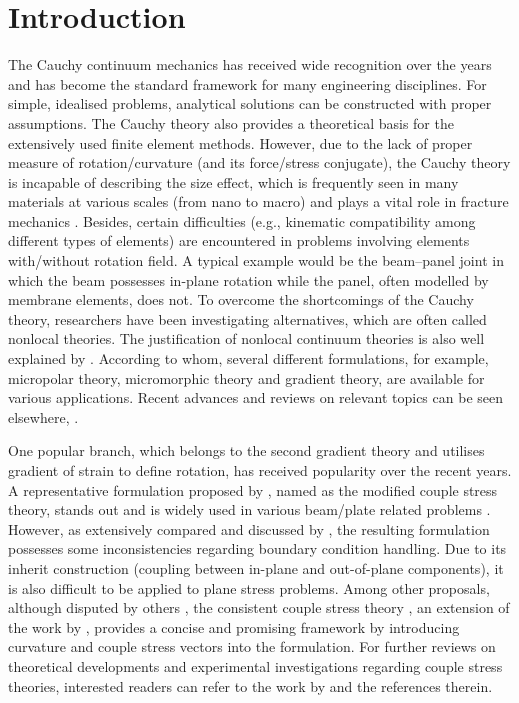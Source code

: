 \documentclass[3p,sort&compress,11pt,fleqn,review]{elsarticle}
\begin{document}
\section{Introduction}
The Cauchy continuum mechanics has received wide recognition over the years and has become the standard framework for many engineering disciplines. For simple, idealised problems, analytical solutions can be constructed \citep[see, e.g.,][]{Timoshenko2010} with proper assumptions. The Cauchy theory also provides a theoretical basis for the extensively used finite element methods. However, due to the lack of proper measure of rotation/curvature (and its force/stress conjugate), the Cauchy theory is incapable of describing the size effect, which is frequently seen in many materials at various scales (from nano to macro) and plays a vital role in fracture mechanics \citep{Bazant1984}. Besides, certain difficulties (e.g., kinematic compatibility among different types of elements) are encountered in problems involving elements with/without rotation field. A typical example would be the beam--panel joint in which the beam possesses in-plane rotation while the panel, often modelled by membrane elements, does not. To overcome the shortcomings of the Cauchy theory, researchers have been investigating alternatives, which are often called nonlocal theories. The justification of nonlocal continuum theories is also well explained by \citet{Eringen2004}. According to whom, several different formulations, for example, micropolar theory, micromorphic theory and gradient theory, are available for various applications. Recent advances and reviews on relevant topics can be seen elsewhere, \citep[to name a few,][]{Maugin2010,Altenbach2011,Srinivasa2017,Thai2017,Faghidian2018,Shaat2017,Aifantis2011,Salehipour2015,Apuzzo2018,Lim2015,Shaat2020}.

One popular branch, which belongs to the second gradient theory and utilises gradient of strain to define rotation, has received popularity over the recent years. A representative formulation proposed by \citet{Yang2002}, named as the modified couple stress theory, stands out and is widely used in various beam/plate related problems \citep[see, e.g.,][]{Khakalo2018,Farokhi2018,Kim2019,Thanh2019,Thanh2019a,Fan2020,Yuan2020,Lu2017}. However, as extensively compared and discussed by \citet{Hadjesfandiari2016}, the resulting formulation possesses some inconsistencies regarding boundary condition handling. Due to its inherit construction (coupling between in-plane and out-of-plane components), it is also difficult to be applied to plane stress problems. Among other proposals, although disputed by others \citep{Neff2016}, the consistent couple stress theory \citep{Hadjesfandiari2011}, an extension of the work by \citet{Mindlin1968}, provides a concise and promising framework by introducing curvature and couple stress vectors into the formulation. For further reviews on theoretical developments and experimental investigations regarding couple stress theories, interested readers can refer to the work by \citet{Pedgaonkar2021} and the references therein.
\end{document}
